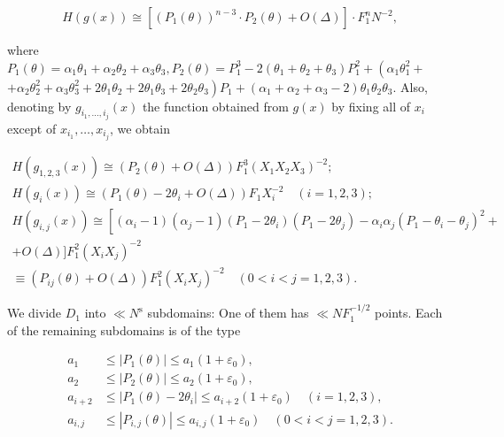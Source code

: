 \documentclass[10pt]{article}
\begin{document}
$$
H(g(x)) \cong\left[\left(P_{1}(\theta)\right)^{n-3} \cdot P_{2}(\theta)+O(\Delta)\right] \cdot F_{1}^{n} N^{-2},
$$

where $P_{1}(\theta)=\alpha_{1} \theta_{1}+\alpha_{2} \theta_{2}+\alpha_{3} \theta_{3}, P_{2}(\theta)=P_{1}^{3}-2\left(\theta_{1}+\theta_{2}+\theta_{3}\right) P_{1}^{2}+\left(\alpha_{1} \theta_{1}^{2}+\right.$ $\left.+\alpha_{2} \theta_{2}^{2}+\alpha_{3} \theta_{3}^{2}+2 \theta_{1} \theta_{2}+2 \theta_{1} \theta_{3}+2 \theta_{2} \theta_{3}\right) P_{1}+\left(\alpha_{1}+\alpha_{2}+\alpha_{3}-2\right) \theta_{1} \theta_{2} \theta_{3}$. Also, denoting by $g_{i_{1}, \ldots, i_{j}}(x)$ the function obtained from $g(x)$ by fixing all of $x_{i}$ except of $x_{i_{1}}, \ldots, x_{i_{j}}$, we obtain

$$
\begin{gathered}
H\left(g_{1,2,3}(x)\right) \cong\left(P_{2}(\theta)+O(\Delta)\right) F_{1}^{3}\left(X_{1} X_{2} X_{3}\right)^{-2} ; \\
H\left(g_{i}(x)\right) \cong\left(P_{1}(\theta)-2 \theta_{i}+O(\Delta)\right) F_{1} X_{i}^{-2} \quad(i=1,2,3) ; \\
H\left(g_{i, j}(x)\right) \cong\left[\left(\alpha_{i}-1\right)\left(\alpha_{j}-1\right)\left(P_{1}-2 \theta_{i}\right)\left(P_{1}-2 \theta_{j}\right)-\alpha_{i} \alpha_{j}\left(P_{1}-\theta_{i}-\theta_{j}\right)^{2}+\right. \\
+O(\Delta)] F_{1}^{2}\left(X_{i} X_{j}\right)^{-2} \\
\equiv\left(P_{i j}(\theta)+O(\Delta)\right) F_{1}^{2}\left(X_{i} X_{j}\right)^{-2} \quad(0<i<j=1,2,3) .
\end{gathered}
$$

We divide $D_{1}$ into $\ll N^{\mathrm{s}}$ subdomains: One of them has $\ll N F_{1}^{-1 / 2}$ points. Each of the remaining subdomains is of the type

$$
\begin{aligned}
a_{1} & \leqslant\left|P_{1}(\theta)\right| \leqslant a_{1}\left(1+\varepsilon_{0}\right), \\
a_{2} & \leqslant\left|P_{2}(\theta)\right| \leqslant a_{2}\left(1+\varepsilon_{0}\right), \\
a_{i+2} & \leqslant\left|P_{1}(\theta)-2 \theta_{i}\right| \leqslant a_{i+2}\left(1+\varepsilon_{0}\right) \quad(i=1,2,3), \\
a_{i, j} & \leqslant\left|P_{i, j}(\theta)\right| \leqslant a_{i, j}\left(1+\varepsilon_{0}\right) \quad(0<i<j=1,2,3) .
\end{aligned}
$$
\end{document}
